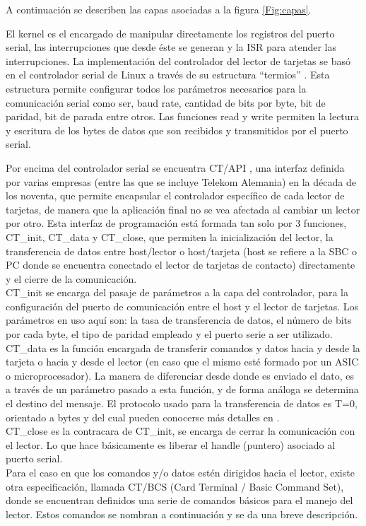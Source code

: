 \bigskip
A continuación se describen las capas asociadas a la figura \ref{Fig:capas}.

\bigskip
{}
El kernel es el encargado de manipular directamente los registros del puerto serial, las interrupciones que desde éste se generan y la ISR para atender las interrupciones.
La implementación del controlador del lector de tarjetas se basó en el controlador serial de Linux a través de su estructura “termios” \cite{termios}. Esta estructura permite configurar todos los parámetros necesarios para la comunicación serial como ser, baud rate, cantidad de bits por byte, bit de paridad, bit de parada entre otros. Las funciones read y write permiten la lectura y escritura de los bytes de datos que son recibidos y transmitidos por el puerto serial.

\bigskip
{}
Por encima del controlador serial se encuentra CT/API \cite{ctapi}, una interfaz definida por varias empresas (entre las que se incluye Telekom Alemania) en la década de los noventa, que permite encapsular el controlador específico de cada lector de tarjetas, de manera que la aplicación final no se vea afectada al cambiar un lector por otro.
Esta interfaz de programación está formada tan solo por 3 funciones, CT\_init, CT\_data y CT\_close, que permiten la inicialización del lector, la transferencia de datos entre host/lector o host/tarjeta (host se refiere a la SBC o PC donde se encuentra conectado el lector de tarjetas de contacto) directamente y el cierre de la comunicación.\\
CT\_init se encarga del pasaje de parámetros a la capa del controlador, para la configuración del puerto de comunicación entre el host y el lector de tarjetas. Los parámetros en uso aquí son: la tasa de transferencia de datos, el número de bits por cada byte, el tipo de paridad empleado y el puerto serie a ser utilizado.\\
CT\_data es la función encargada de transferir comandos y datos hacia y desde la tarjeta o hacia y desde el lector (en caso que el mismo esté formado por un ASIC o microprocesador). La manera de diferenciar desde donde es enviado el dato, es a través de un parámetro pasado a esta función, y de forma análoga se determina el destino del mensaje. El protocolo usado para la transferencia de datos es T=0, orientado a bytes y del cual pueden conocerse más detalles en \cite{SCHb}.\\
CT\_close es la contracara de  CT\_init, se encarga de cerrar la comunicación con el lector. Lo que hace básicamente es liberar el handle (puntero) asociado al puerto serial.\\
Para el caso en que los comandos y/o datos estén dirigidos hacia el lector, existe otra especificación, llamada CT/BCS \cite{ctbcs} (Card Terminal / Basic Command Set), donde se encuentran definidos una serie de comandos básicos para el manejo del lector. Estos comandos se nombran a continuación y se da una breve descripción.

